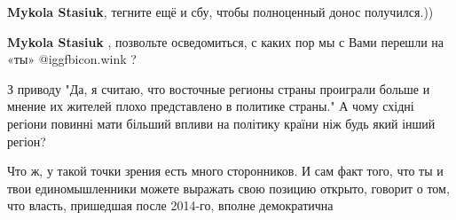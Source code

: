 \begin{itemize}
\begin{itemize}
\textbf{Mykola Stasiuk}, тегните ещё и сбу, чтобы полноценный донос получился.))

\textbf{Mykola Stasiuk} , позвольте осведомиться, с каких пор мы с Вами перешли на «ты»  @igg{fbicon.wink} ?
\end{itemize} %


З приводу "Да, я считаю, что восточные регионы страны проиграли больше и мнение
их жителей плохо представлено в политике страны." А чому східні регіони повинні
мати більший впливи на політику країни ніж будь який інший регіон?



Что ж, у такой точки зрения есть много сторонников. И сам факт того, что ты и
твои единомышленники можете выражать свою позицию открыто, говорит о том, что
власть, пришедшая после 2014-го, вполне демократична

\end{itemize} %
